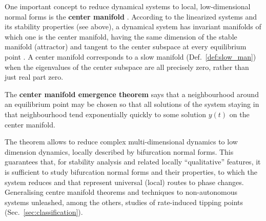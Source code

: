 One important concept to reduce dynamical systems to local, low-dimensional normal forms is the \textbf{center manifold} \citep{Haragus2010,Crawford1991a}. According to the linearized systems and its stability properties (see above), a dynamical system has invariant manifolds of which one is the center manifold, having the same dimension of the stable manifold (attractor) and tangent to the center subspace at every equilibrium point \citep{Guckenheimer2009a}. A center manifold corresponds to a slow manifold (Def.~\ref{def:slow_man}) when the eigenvalues of the center subspace are all precisely zero, rather than just real part zero. 
\begin{theorem}
	The \textbf{center manifold emergence theorem} says that a neighbourhood around an equilibrium point may be chosen so that all solutions of the system staying in that neighbourhood tend exponentially quickly to some solution $y(t)$ on the center manifold.
	\label{th:centre_man}
\end{theorem}
The theorem allows to reduce complex multi-dimensional dynamics to low dimension dynamics, locally described by bifurcation normal forms. This guarantees that, for stability analysis and related locally ``qualitative'' features, it is sufficient to study bifurcation normal forms and their properties, to which the system reduces and that represent universal (local) routes to phase changes. Generalising centre manifold theorems and techniques to non-autonomous systems \citep{potzsche2006taylor} unleashed, among the others, studies of rate-induced tipping points (Sec.~\ref{sec:classification}).  \\

